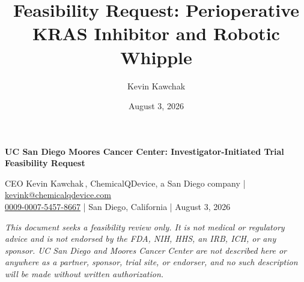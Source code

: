 \documentclass[11pt]{article}
\title{Feasibility Request: Perioperative KRAS Inhibitor and Robotic Whipple}
\author{Kevin Kawchak}
\date{August 3, 2026}
\begin{document}
\thispagestyle{plain}


\vspace{0.3em}

{\raggedright\large\bfseries\color{protoblue} UC San Diego Moores Cancer Center:
Investigator-Initiated Trial Feasibility Request\par}

\vspace{0.1em}
\apprule{0.8pt}

\noindent\small CEO Kevin Kawchak\,,
ChemicalQDevice, a San Diego company \;|\;
\href{mailto:kevink@chemicalqdevice.com}{kevink@chemicalqdevice.com}\\
\href{https://orcid.org/0009-0007-5457-8667}{0009-0007-5457-8667} \;|\;
San Diego, California \;|\; August 3, 2026\normalsize\par

\vspace{0.05em}

\noindent\footnotesize\textit{This document seeks a feasibility review only. It
is not medical or regulatory advice and is not endorsed by the FDA, NIH, HHS, an
IRB, ICH, or any sponsor. UC San Diego and Moores Cancer Center are not
described here or anywhere as a partner, sponsor, trial site, or endorser, and
no such description will be made without written authorization.}\normalsize\par

\vspace{-0.1em}
\apprule{0.4pt}







\end{document}
